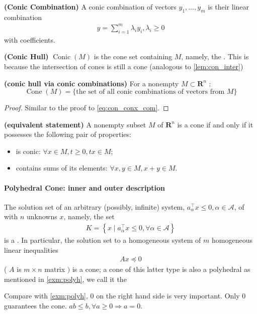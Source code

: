 \documentclass{article}
\newcommand{\bfs}[1]{\textbf{({#1}) }}
\begin{document}
\begin{defa}{\bfs{Conic Combination}}\label{def:cone_com}
 A conic combination of  vectors $y_{1}, \ldots, y_{m}$ is their linear combination
\begin{align*}
y=\sum_{i=1}^{m} \lambda_{i} y_{i}, \lambda_{i} \geq 0 
\end{align*}
with  coefficients.
\end{defa}
\begin{defa}{\bfs{Conic Hull}} 
 $\operatorname{Conic}(M)$  is the  cone set containing $M$, namely, the . This is because the intersection of cones is still a cone (analogous to \cref{lem:con_inter})
\end{defa}
\begin{cora}{\bfs{conic hull via conic combinations}}
For a nonempty $M \subset \mathbf{R}^{n}$ :
$$\operatorname{Cone}(M)=\{ \text{the set of all conic combinations of vectors from } M\} $$
\end{cora}
\begin{proof}\color{ForestGreen}
Similar to the proof to \cref{eq:con_conx_com}.
\end{proof}

\begin{rema}{\bfs{equivalent statement}}\label{rema:equ_coni}
A nonempty subset $M$ of $\mathbf{R}^{n}$ is a cone if and only if it possesses the following pair of properties:
\begin{itemize}
    \item is conic: $\forall x \in M, t \geq 0, t x \in M$;
    \item contains sums of its elements: $\forall x, y \in M, x+y \in M$.
\end{itemize}
\end{rema}

\paragraph{Polyhedral Cone: inner and outer description}
\begin{exma}\label{exma:ply_con}
 The solution set of an arbitrary (possibly, infinite) system, $a_{\alpha}^{\top} x \leq 0, \alpha \in \mathcal{A}$, 
of  with $n$ unknowns $x$, namely, the set
\begin{align*}
K=\left\{x \mid a_{\alpha}^{\top} x \leq 0, \forall \alpha \in \mathcal{A}\right\}
\end{align*}
is a . In particular, the solution set to a homogeneous  system of $m$ homogeneous linear inequalities
\begin{align*}
A x \preceq 0
\end{align*}
( $A$ is $m \times n$ matrix $)$ is a cone; a cone of this latter type is also a {polyhedral} as mentioned in \cref{exm:polyh}, we call it the  
\end{exma}
\begin{rema}\label{rema:homo_con}
Compare with \cref{exm:polyh}, $0$ on the right hand side is very important. Only $0$ guarantees the cone. $ab\le b, \forall a\ge 0\Rightarrow a=0$.  
\end{rema}
\end{document}
